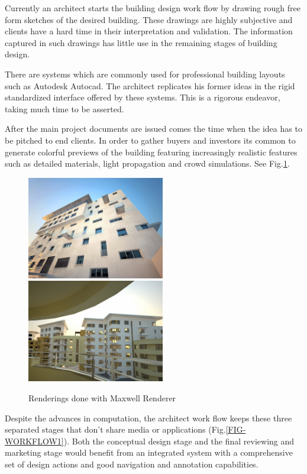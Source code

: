 Currently an architect starts the building design work flow by drawing rough
free form sketches of the desired building. These drawings are highly subjective
and clients have a hard time in their interpretation and validation.
The information captured in such drawings has little use in the remaining stages
of building design.


There are systems which are commonly used for professional building layouts
such as Autodesk Autocad.
The architect replicates his former ideas in the rigid standardized interface
offered by these systems. This is a rigorous endeavor, taking much time to be asserted.

After the main project documents are issued comes the time when the idea has to
be pitched to end clients.
In order to gather buyers and investors its common to generate colorful previews of the building featuring increasingly realistic features such as detailed materials, light propagation and crowd simulations. See
Fig.\ref{FIG-REALISTIC}.

\begin{figure}[!ht]
	\centering
	\includegraphics[width=6cm]{gfx/realistic01.jpg}
	\includegraphics[width=6cm]{gfx/realistic03.jpg}
	\caption{Renderings done with Maxwell Renderer}
	\label{FIG-REALISTIC}
\end{figure}

Despite the advances in computation, the architect work flow keeps these three separated stages
that don't share media or applications (Fig.\ref{FIG-WORKFLOW1}).
Both the conceptual design stage and the final reviewing and marketing stage would benefit from 
an integrated system with a comprehensive set of design actions and good navigation and annotation
capabilities.

